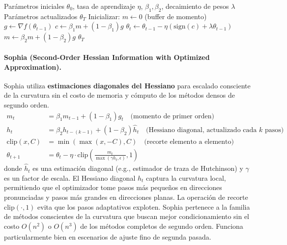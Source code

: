 \documentclass[11pt,a4paper]{article}
\begin{document}
\begin{algorithm}[H]
\caption{Lion (EvoLved Sign Momentum)}
\label{alg:lion}
\begin{algorithmic}[1]
\Require Parámetros iniciales $\theta_0$, tasa de aprendizaje $\eta$, $\beta_1, \beta_2$, decaimiento de pesos $\lambda$
\Ensure Parámetros actualizados $\theta_T$
\State Inicializar: $m \gets 0$ (buffer de momento)
    \State $g \gets \nabla f(\theta_{t-1})$ 
    \State $c \gets \beta_1 m + (1-\beta_1) g$ 
    \State $\theta_t \gets \theta_{t-1} - \eta (\text{sign}(c) + \lambda \theta_{t-1})$ 
    \State $m \gets \beta_2 m + (1-\beta_2) g$ 
\EndFor
\Return $\theta_T$
\end{algorithmic}
\end{algorithm}

\paragraph{Sophia (Second-Order Hessian Information with Optimized Approximation).}
Sophia utiliza \textbf{estimaciones diagonales del Hessiano} para escalado consciente de la curvatura sin el costo de memoria y cómputo de los métodos densos de segundo orden.\begin{align}
m_t &= \beta_1 m_{t-1} + (1-\beta_1) g_t \quad\text{(momento de primer orden)} \\
h_t &= \beta_2 h_{t-(k-1)} + (1-\beta_2) \hat{h}_t \quad\text{(Hessiano diagonal, actualizado cada $k$ pasos)} \\
\text{clip}(x, C) &= \min(\max(x, -C), C) \quad\text{(recorte elemento a elemento)} \\
\theta_{t+1} &= \theta_t - \eta \cdot \text{clip}\left(\frac{m_t}{\max(\gamma h_t, \epsilon)}, 1\right)
\end{align}
donde $\hat{h}_t$ es una estimación diagonal (e.g., estimador de traza de Hutchinson) y $\gamma$ es un factor de escala. El Hessiano diagonal $h_t$ captura la curvatura local, permitiendo que el optimizador tome pasos más pequeños en direcciones pronunciadas y pasos más grandes en direcciones planas. La operación de recorte $\text{clip}(\cdot, 1)$ evita que los pasos adaptativos exploten. Sophia pertenece a la familia de métodos conscientes de la curvatura que buscan mejor condicionamiento sin el costo $O(n^2)$ o $O(n^3)$ de los métodos completos de segundo orden. Funciona particularmente bien en escenarios de ajuste fino de segunda pasada.
\end{document}
